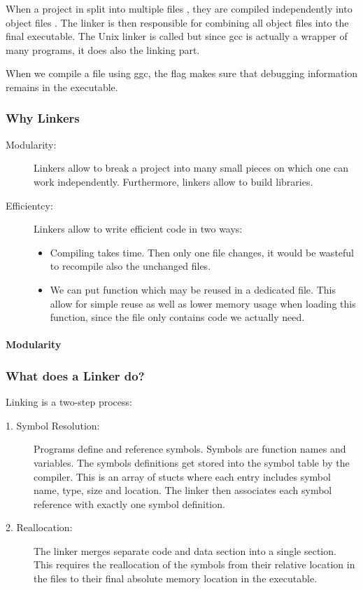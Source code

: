 
When a project in split into multiple files , they are compiled independently into object files . The linker is then responsible for combining all object files into the final executable. The Unix linker is called  but since gcc is actually a wrapper of many programs, it does also the linking part.

When we compile a file using ggc, the  flag makes sure that debugging information remains in the executable.

\subsubsection{Why Linkers}
\begin{description}
    \item[Modularity:] Linkers allow to break a project into many small pieces on which one can work independently. Furthermore, linkers allow to build libraries.
    \item[Efficientcy:] Linkers allow to write efficient code in two ways:
        \begin{itemize}
            \item Compiling takes time. Then only one file changes, it would be wasteful to recompile also the unchanged files. 
            \item We can put function which may be reused in a dedicated file. This allow for simple reuse as well as lower memory usage when loading this function, since the file only contains code we actually need.
        \end{itemize}
\end{description}
\paragraph{Modularity}

\subsubsection{What does a Linker do?}
Linking is a two-step process:
\begin{description}
    \item[1. Symbol Resolution:] Programs define and reference symbols. Symbols are function names and variables. The symbols definitions get stored into the symbol table by the compiler. This is an array of stucts where each entry includes symbol name, type, size and location. The linker then associates each symbol reference with exactly one symbol definition.
    \item[2. Reallocation:] The linker merges separate code and data section into a single section. This requires the reallocation of the symbols from their relative location in the  files to their final absolute memory location in the executable.
\end{description}

